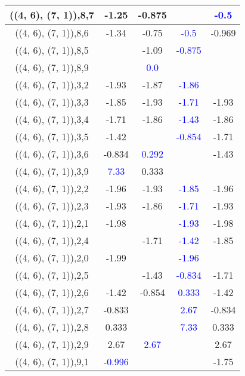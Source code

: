 \documentclass{article}
\begin{document}
\begin{center}
\begin{longtable}{|c|c|c|c|c|}
        	\hline
        	((4, 6), (7, 1)),8,7&-1.25&-0.875&& \textcolor{blue}{-0.5}\\
        	\hline
        	((4, 6), (7, 1)),8,6&-1.34&-0.75& \textcolor{blue}{-0.5}&-0.969\\
        	\hline
        	((4, 6), (7, 1)),8,5&&-1.09& \textcolor{blue}{-0.875}&\\
        	\hline
        	((4, 6), (7, 1)),8,9&& \textcolor{blue}{0.0}&&\\
        	\hline
        	((4, 6), (7, 1)),3,2&-1.93&-1.87& \textcolor{blue}{-1.86}&\\
        	\hline
        	((4, 6), (7, 1)),3,3&-1.85&-1.93& \textcolor{blue}{-1.71}&-1.93\\
        	\hline
        	((4, 6), (7, 1)),3,4&-1.71&-1.86& \textcolor{blue}{-1.43}&-1.86\\
        	\hline
        	((4, 6), (7, 1)),3,5&-1.42&& \textcolor{blue}{-0.854}&-1.71\\
        	\hline
        	((4, 6), (7, 1)),3,6&-0.834& \textcolor{blue}{0.292}&&-1.43\\
        	\hline
        	((4, 6), (7, 1)),3,9& \textcolor{blue}{7.33}&0.333&&\\
        	\hline
        	((4, 6), (7, 1)),2,2&-1.96&-1.93& \textcolor{blue}{-1.85}&-1.96\\
        	\hline
        	((4, 6), (7, 1)),2,3&-1.93&-1.86& \textcolor{blue}{-1.71}&-1.93\\
        	\hline
        	((4, 6), (7, 1)),2,1&-1.98&& \textcolor{blue}{-1.93}&-1.98\\
        	\hline
        	((4, 6), (7, 1)),2,4&&-1.71& \textcolor{blue}{-1.42}&-1.85\\
        	\hline
        	((4, 6), (7, 1)),2,0&-1.99&& \textcolor{blue}{-1.96}&\\
        	\hline
        	((4, 6), (7, 1)),2,5&&-1.43& \textcolor{blue}{-0.834}&-1.71\\
        	\hline
        	((4, 6), (7, 1)),2,6&-1.42&-0.854& \textcolor{blue}{0.333}&-1.42\\
        	\hline
        	((4, 6), (7, 1)),2,7&-0.833&& \textcolor{blue}{2.67}&-0.834\\
        	\hline
        	((4, 6), (7, 1)),2,8&0.333&& \textcolor{blue}{7.33}&0.333\\
        	\hline
        	((4, 6), (7, 1)),2,9&2.67& \textcolor{blue}{2.67}&&2.67\\
        	\hline
        	((4, 6), (7, 1)),9,1& \textcolor{blue}{-0.996}&&&-1.75\\

\end{longtable}
\end{center}
\end{document}
